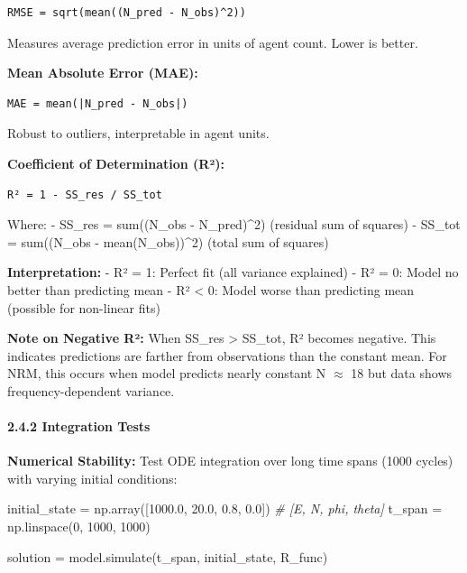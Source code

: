 \documentclass[
]{article}
\newenvironment{Shaded}{}{}
\newcommand{\CommentTok}[1]{\textcolor[rgb]{0.38,0.63,0.69}{\textit{#1}}}
\newcommand{\DecValTok}[1]{\textcolor[rgb]{0.25,0.63,0.44}{#1}}
\newcommand{\FloatTok}[1]{\textcolor[rgb]{0.25,0.63,0.44}{#1}}
\newcommand{\NormalTok}[1]{#1}
\newcommand{\OperatorTok}[1]{\textcolor[rgb]{0.40,0.40,0.40}{#1}}
\begin{document}
\begin{verbatim}
RMSE = sqrt(mean((N_pred - N_obs)^2))
\end{verbatim}

Measures average prediction error in units of agent count. Lower is
better.

\textbf{Mean Absolute Error (MAE):}

\begin{verbatim}
MAE = mean(|N_pred - N_obs|)
\end{verbatim}

Robust to outliers, interpretable in agent units.

\textbf{Coefficient of Determination (R²):}

\begin{verbatim}
R² = 1 - SS_res / SS_tot
\end{verbatim}

Where: - SS\_res = sum((N\_obs - N\_pred)\^{}2) (residual sum of
squares) - SS\_tot = sum((N\_obs - mean(N\_obs))\^{}2) (total sum of
squares)

\textbf{Interpretation:} - R² = 1: Perfect fit (all variance explained)
- R² = 0: Model no better than predicting mean - R² \textless{} 0: Model
worse than predicting mean (possible for non-linear fits)

\textbf{Note on Negative R²:} When SS\_res \textgreater{} SS\_tot, R²
becomes negative. This indicates predictions are farther from
observations than the constant mean. For NRM, this occurs when model
predicts nearly constant N $\approx$ 18 but data shows frequency-dependent
variance.

\paragraph{2.4.2 Integration Tests}\label{integration-tests}

\textbf{Numerical Stability:} Test ODE integration over long time spans
(1000 cycles) with varying initial conditions:

\begin{Shaded}
\begin{Highlighting}[]
\NormalTok{initial\_state }\OperatorTok{=}\NormalTok{ np.array([}\FloatTok{1000.0}\NormalTok{, }\FloatTok{20.0}\NormalTok{, }\FloatTok{0.8}\NormalTok{, }\FloatTok{0.0}\NormalTok{])  }\CommentTok{\# [E, N, phi, theta]}
\NormalTok{t\_span }\OperatorTok{=}\NormalTok{ np.linspace(}\DecValTok{0}\NormalTok{, }\DecValTok{1000}\NormalTok{, }\DecValTok{1000}\NormalTok{)}

\NormalTok{solution }\OperatorTok{=}\NormalTok{ model.simulate(t\_span, initial\_state, R\_func)}
\end{Highlighting}
\end{Shaded}
\end{document}
